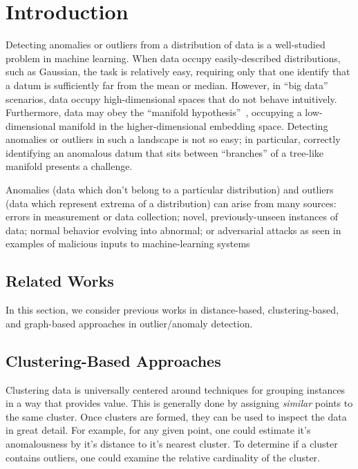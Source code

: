 \section{Introduction}
\label{sec:introduction}

Detecting anomalies or outliers from a distribution of data is a well-studied problem in machine learning.
When data occupy easily-described distributions, such as Gaussian, the task is relatively easy, requiring only that one identify that a datum is sufficiently far from the mean or median. 
However, in ``big data'' scenarios, data occupy high-dimensional spaces that do not behave intuitively. 
Furthermore, data may obey the ``manifold hypothesis''~\cite{fefferman2016testing}, occupying a low-dimensional manifold in the higher-dimensional embedding space.
Detecting anomalies or outliers in such a landscape is not so easy; in particular, correctly identifying an anomalous datum that sits between ``branches'' of a tree-like manifold presents a challenge.

Anomalies (data which don't belong to a particular distribution) and outliers (data which represent extrema of a distribution) can arise from many sources: errors in measurement or data collection; novel, previously-unseen instances of data; normal behavior evolving into abnormal; or adversarial attacks as seen in examples of malicious inputs to machine-learning systems~\cite{schoolbus-ostrich}


\subsection{Related Works}
\label{sec:related_works}

In this section, we consider previous works in distance-based, clustering-based, and graph-based approaches in outlier/anomaly detection.

\subsection{Clustering-Based Approaches}

Clustering data is universally centered around techniques for grouping instances in a way that provides value.
This is generally done by assigning \textit{similar} points to the same cluster.
Once clusters are formed, they can be used to inspect the data in great detail.
For example, for any given point, one could estimate it's anomalousness by it's distance to it's nearest cluster.
To determine if a cluster contains outliers, one could examine the relative cardinality of the cluster.

